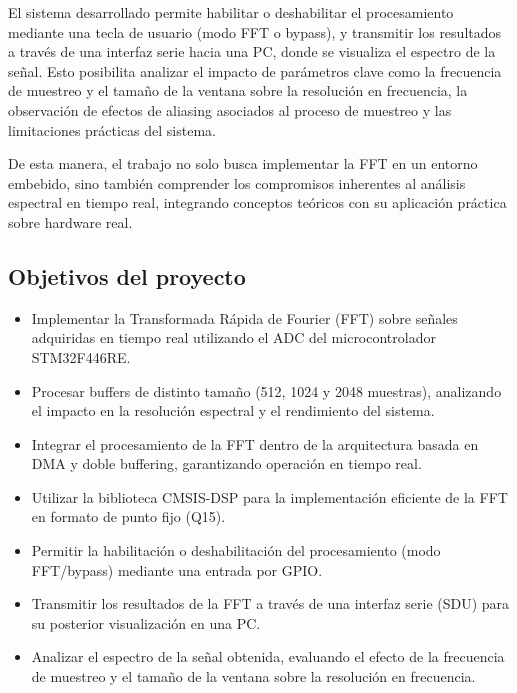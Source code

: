 \documentclass[12pt]{article}
\begin{document}
		El sistema desarrollado permite habilitar o deshabilitar el procesamiento mediante una tecla de usuario (modo FFT o bypass), y transmitir los resultados a través de una interfaz serie hacia una PC, donde se visualiza el espectro de la señal. Esto posibilita analizar el impacto de parámetros clave como la frecuencia de muestreo y el tamaño de la ventana sobre la resolución en frecuencia, la observación de efectos de aliasing asociados al proceso de muestreo y las limitaciones prácticas del sistema.

		De esta manera, el trabajo no solo busca implementar la FFT en un entorno embebido, sino también comprender los compromisos inherentes al análisis espectral en tiempo real, integrando conceptos teóricos con su aplicación práctica sobre hardware real.

		\subsection{Objetivos del proyecto}
		
			\begin{itemize}
			\item Implementar la Transformada Rápida de Fourier (FFT) sobre señales adquiridas en tiempo real utilizando el ADC del microcontrolador STM32F446RE.
			
			\item Procesar buffers de distinto tamaño (512, 1024 y 2048 muestras), analizando el impacto en la resolución espectral y el rendimiento del sistema.
			
			\item Integrar el procesamiento de la FFT dentro de la arquitectura basada en DMA y doble buffering, garantizando operación en tiempo real.
			
			\item Utilizar la biblioteca CMSIS-DSP para la implementación eficiente de la FFT en formato de punto fijo (Q15).
			
			\item Permitir la habilitación o deshabilitación del procesamiento (modo FFT/bypass) mediante una entrada por GPIO.
			
			\item Transmitir los resultados de la FFT a través de una interfaz serie (SDU) para su posterior visualización en una PC.
			
			\item Analizar el espectro de la señal obtenida, evaluando el efecto de la frecuencia de muestreo y el tamaño de la ventana sobre la resolución en frecuencia.
			
			\end{itemize}
			
\end{document}
